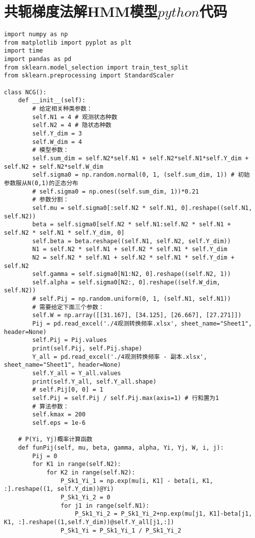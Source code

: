 \section{共轭梯度法解HMM模型$python$代码}
\begin{lstlisting}
import numpy as np
from matplotlib import pyplot as plt
import time
import pandas as pd
from sklearn.model_selection import train_test_split
from sklearn.preprocessing import StandardScaler

class NCG():
    def __init__(self):
        # 给定相关种类参数：
        self.N1 = 4 # 观测状态种数
        self.N2 = 4 # 隐状态种数
        self.Y_dim = 3
        self.W_dim = 4
        # 模型参数：
        self.sum_dim = self.N2*self.N1 + self.N2*self.N1*self.Y_dim + self.N2 + self.N2*self.W_dim
        self.sigma0 = np.random.normal(0, 1, (self.sum_dim, 1)) # 初始参数服从N(0,1)的正态分布
        # self.sigma0 = np.ones((self.sum_dim, 1))*0.21
        # 参数分割：
        self.mu = self.sigma0[:self.N2 * self.N1, 0].reshape((self.N1, self.N2))
        beta = self.sigma0[self.N2 * self.N1:self.N2 * self.N1 + self.N2 * self.N1 * self.Y_dim, 0]
        self.beta = beta.reshape((self.N1, self.N2, self.Y_dim))
        N1 = self.N2 * self.N1 + self.N2 * self.N1 * self.Y_dim
        N2 = self.N2 * self.N1 + self.N2 * self.N1 * self.Y_dim + self.N2
        self.gamma = self.sigma0[N1:N2, 0].reshape((self.N2, 1))
        self.alpha = self.sigma0[N2:, 0].reshape((self.W_dim, self.N2))
        # self.Pij = np.random.uniform(0, 1, (self.N1, self.N1))
        # 需要给定下面三个参数：
        self.W = np.array([[31.167], [34.125], [26.667], [27.271]])
        Pij = pd.read_excel('./4观测转换频率.xlsx', sheet_name="Sheet1", header=None)
        self.Pij = Pij.values
        print(self.Pij, self.Pij.shape)
        Y_all = pd.read_excel('./4观测转换频率 - 副本.xlsx', sheet_name="Sheet1", header=None)
        self.Y_all = Y_all.values
        print(self.Y_all, self.Y_all.shape)
        # self.Pij[0, 0] = 1
        self.Pij = self.Pij / self.Pij.max(axis=1) # 行和置为1
        # 算法参数：
        self.kmax = 200
        self.eps = 1e-6

    # P(Yi, Yj)概率计算函数
    def funPij(self, mu, beta, gamma, alpha, Yi, Yj, W, i, j):
        Pij = 0
        for K1 in range(self.N2):
            for K2 in range(self.N2):
                P_Sk1_Yi_1 = np.exp(mu[i, K1] - beta[i, K1, :].reshape((1, self.Y_dim))@Yi)
                P_Sk1_Yi_2 = 0
                for j1 in range(self.N1):
                    P_Sk1_Yi_2 = P_Sk1_Yi_2+np.exp(mu[j1, K1]-beta[j1, K1, :].reshape((1,self.Y_dim))@self.Y_all[j1,:])
                P_Sk1_Yi = P_Sk1_Yi_1 / P_Sk1_Yi_2


\end{lstlisting}
